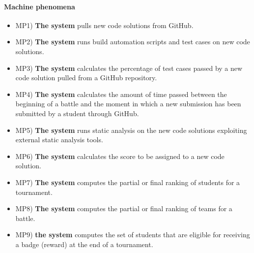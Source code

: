 	\paragraph{Machine phenomena}
	\begin{itemize}
		\item MP1) \textbf{The system} pulls new code solutions from GitHub.
		\item MP2) \textbf{The system} runs build automation scripts and test cases on new code solutions.
		\item MP3) \textbf{The system} calculates the percentage of test cases passed by a new code solution pulled from a GitHub repository.
		\item MP4) \textbf{The system} calculates the amount of time passed between the beginning of a battle and the moment in which a new submission has been submitted by a student through GitHub.
		\item MP5) \textbf{The system} runs static analysis on the new code solutions exploiting external static analysis tools.
		\item MP6) \textbf{The system} calculates the score to be assigned to a new code solution.
		\item MP7) \textbf{The system} computes the partial or final ranking of students for a tournament.
		\item MP8) \textbf{The system} computes the partial or final ranking of teams for a battle.
		\item MP9) \textbf{the system} computes the set of students that are eligible for receiving a badge (reward) at the end of a tournament.
	\end{itemize}
	
